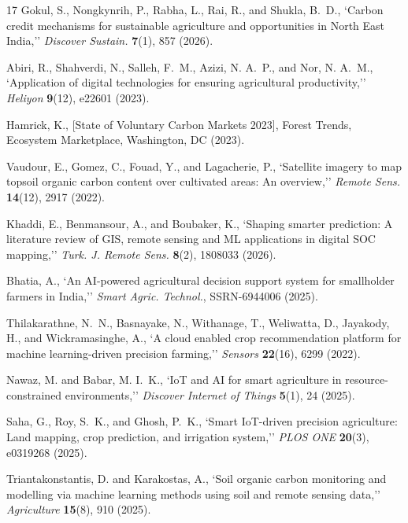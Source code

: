 \documentclass[a4paper,10pt]{article}
\begin{document}
\renewcommand{\refname}{References}
\begin{thebibliography}{17}
Gokul, S., Nongkynrih, P., Rabha, L., Rai, R., and Shukla, B.~D., `Carbon credit mechanisms for sustainable agriculture and opportunities in North East India,'' {\itshape Discover Sustain.} {\bfseries 7}(1), 857 (2026).

Abiri, R., Shahverdi, N., Salleh, F.~M., Azizi, N. A.~P., and Nor, N. A.~M., `Application of digital technologies for ensuring agricultural productivity,'' {\itshape Heliyon} {\bfseries 9}(12), e22601 (2023).

Hamrick, K., [State of Voluntary Carbon Markets 2023], Forest Trends, Ecosystem Marketplace, Washington, DC (2023).

Vaudour, E., Gomez, C., Fouad, Y., and Lagacherie, P., `Satellite imagery to map topsoil organic carbon content over cultivated areas: An overview,'' {\itshape Remote Sens.} {\bfseries 14}(12), 2917 (2022).

Khaddi, E., Benmansour, A., and Boubaker, K., `Shaping smarter prediction: A literature review of GIS, remote sensing and ML applications in digital SOC mapping,'' {\itshape Turk. J. Remote Sens.} {\bfseries 8}(2), 1808033 (2026).

Bhatia, A., `An AI-powered agricultural decision support system for smallholder farmers in India,'' {\itshape Smart Agric. Technol.}, SSRN-6944006 (2025).

Thilakarathne, N.~N., Basnayake, N., Withanage, T., Weliwatta, D., Jayakody, H., and Wickramasinghe, A., `A cloud enabled crop recommendation platform for machine learning-driven precision farming,'' {\itshape Sensors} {\bfseries 22}(16), 6299 (2022).

Nawaz, M. and Babar, M. I.~K., `IoT and AI for smart agriculture in resource-constrained environments,'' {\itshape Discover Internet of Things} {\bfseries 5}(1), 24 (2025).

Saha, G., Roy, S.~K., and Ghosh, P.~K., `Smart IoT-driven precision agriculture: Land mapping, crop prediction, and irrigation system,'' {\itshape PLOS ONE} {\bfseries 20}(3), e0319268 (2025).

Triantakonstantis, D. and Karakostas, A., `Soil organic carbon monitoring and modelling via machine learning methods using soil and remote sensing data,'' {\itshape Agriculture} {\bfseries 15}(8), 910 (2025).


\end{thebibliography}
\end{document}
